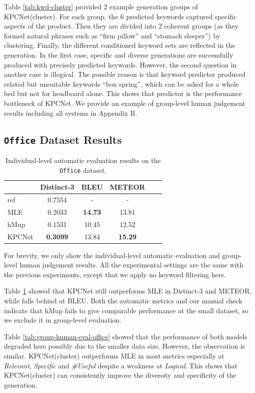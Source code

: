 Table \ref{tab:kwd-cluster} provided 2 example generation groups of KPCNet(cluster). For each group, the 6 predicted keywords captured specific aspects of the product. Then they are divided into 2 coherent groups (as they formed natural phrases such as ``firm pillow'' and ``stomach sleeper'') by clustering. Finally, the different conditioned keyword sets are reflected in the generation. In the first case, specific and diverse generations are successfully produced with precisely predicted keywords. However, the second question in another case is illogical. The possible reason is that keyword predictor produced related but unsuitable keywords ``box spring'', which can be asked for a whole bed but not for headboard alone. This shows that predictor is the performance bottleneck of KPCNet. We provide an example of group-level human judgement results including all systems in Appendix B.

\subsection{\texttt{Office} Dataset Results}


\begin{table}[h]
  \centering
  \small
  \begin{tabular}{l|ccccc}
  \hline
  {} & Distinct-3 & BLEU & METEOR \\
  \hline
  ref  &        0.7554 &        - &    - \\
  \hline
  MLE &        0.2033 &  \textbf{14.73} & 13.81 \\
  hMup &        0.1531 &  10.45 &    12.52  \\
  KPCNet &        \textbf{0.3099} &     13.84 &    \textbf{15.29}  \\
  \hline
  \end{tabular}
  \caption{\label{tab:ind-auto-eval-office} Individual-level automatic evaluation results on the \texttt{Office} dataset.}
\end{table}

For brevity, we only show the individual-level automatic evaluation and group-level human judgement results. All the experimental settings are the same with the previous experiments, except that we apply no keyword filtering here. 

Table \ref{tab:ind-auto-eval-office} showed that KPCNet still outperforms MLE in Distinct-3 and METEOR, while falls behind at BLEU. Both the automatic metrics and our manual check indicate that hMup fails to give comparable performance at the small dataset, so we exclude it in group-level evaluation. 

Table \ref{tab:group-human-eval-office} showed that the performance of both models degraded here possibly due to the smaller data size. However, the observation is similar. KPCNet(cluster) outperforms MLE in most metrics especially at \textit{Relevant}, \textit{Specific} and \textit{\#Useful} despite a weakness at \textit{Logical}. This shows that KPCNet(cluster) can consistently improve the diversity and specificity of the generation.

